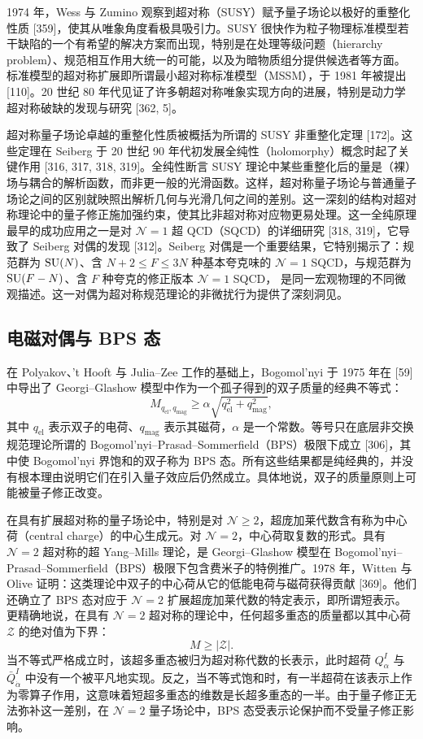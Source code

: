 1974 年，Wess 与 Zumino 观察到超对称（SUSY）赋予量子场论以极好的重整化性质 [359]，使其从唯象角度看极具吸引力。SUSY 很快作为粒子物理标准模型若干缺陷的一个有希望的解决方案而出现，特别是在处理等级问题（hierarchy problem）、规范相互作用大统一的可能，以及为暗物质组分提供候选者等方面。标准模型的超对称扩展即所谓最小超对称标准模型（MSSM），于 1981 年被提出 [110]。20 世纪 80 年代见证了许多朝超对称唯象实现方向的进展，特别是动力学超对称破缺的发现与研究 [362, 5]。

超对称量子场论卓越的重整化性质被概括为所谓的 SUSY 非重整化定理 [172]。这些定理在 Seiberg 于 20 世纪 90 年代初发展全纯性（holomorphy）概念时起了关键作用 [316, 317, 318, 319]。全纯性断言 SUSY 理论中某些重整化后的量是（裸）场与耦合的解析函数，而非更一般的光滑函数。这样，超对称量子场论与普通量子场论之间的区别就映照出解析几何与光滑几何之间的差别。这一深刻的结构对超对称理论中的量子修正施加强约束，使其比非超对称对应物更易处理。这一全纯原理最早的成功应用之一是对 $\mathcal{N}=1$ 超 QCD（SQCD）的详细研究 [318, 319]，它导致了 Seiberg 对偶的发现 [312]。Seiberg 对偶是一个重要结果，它特别揭示了：规范群为 $\operatorname{SU}(N)$、含 $N+2\le F\le 3N$ 种基本夸克味的 $\mathcal{N}=1$ SQCD，与规范群为 $\operatorname{SU}(F-N)$、含 $F$ 种夸克的修正版本 $\mathcal{N}=1$ SQCD，
是同一宏观物理的不同微观描述。这一对偶为超对称规范理论的非微扰行为提供了深刻洞见。

\subsection*{电磁对偶与 BPS 态}

在 Polyakov、't Hooft 与 Julia--Zee 工作的基础上，Bogomol'nyi 于 1975 年在 [59] 中导出了 Georgi--Glashow 模型中作为一个孤子得到的双子质量的经典不等式：
\[
M_{q_{\mathrm{el}},q_{\mathrm{mag}}}\ge\alpha\sqrt{q_{\mathrm{el}}^2+q_{\mathrm{mag}}^2},
\]
其中 $q_{\mathrm{el}}$ 表示双子的电荷、$q_{\mathrm{mag}}$ 表示其磁荷，$\alpha$ 是一个常数。等号只在底层非交换规范理论所谓的 Bogomol'nyi--Prasad--Sommerfield（BPS）极限下成立 [306]，其中使 Bogomol'nyi 界饱和的双子称为 BPS 态。所有这些结果都是纯经典的，并没有根本理由说明它们在引入量子效应后仍然成立。具体地说，双子的质量原则上可能被量子修正改变。

在具有扩展超对称的量子场论中，特别是对 $\mathcal{N}\ge 2$，超庞加莱代数含有称为中心荷（central charge）的中心生成元。对 $\mathcal{N}=2$，中心荷取复数的形式。具有 $\mathcal{N}=2$ 超对称的超 Yang--Mills 理论，是 Georgi--Glashow 模型在 Bogomol'nyi--Prasad--Sommerfield（BPS）极限下包含费米子的特例推广。1978 年，Witten 与 Olive 证明：这类理论中双子的中心荷从它的低能电荷与磁荷获得贡献 [369]。他们还确立了 BPS 态对应于 $\mathcal{N}=2$ 扩展超庞加莱代数的特定表示，即所谓短表示。更精确地说，在具有 $\mathcal{N}=2$ 超对称的理论中，任何超多重态的质量都以其中心荷 $\mathcal{Z}$ 的绝对值为下界：
\[
M\ge|\mathcal{Z}|.
\]
当不等式严格成立时，该超多重态被归为超对称代数的长表示，此时超荷 $Q^I_\alpha$ 与 $\bar Q^I_{\dot\alpha}$ 中没有一个被平凡地实现。反之，当不等式饱和时，有一半超荷在该表示上作为零算子作用，这意味着短超多重态的维数是长超多重态的一半。由于量子修正无法弥补这一差别，在 $\mathcal{N}=2$ 量子场论中，BPS 态受表示论保护而不受量子修正影响。

